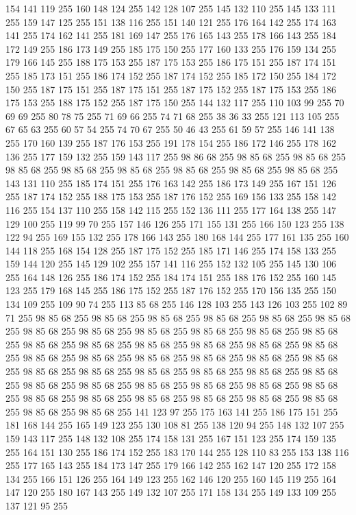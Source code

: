 154 141 119 255 160 148 124 255 142 128 107 255 145 132 110 255 145 133 111 255 159 147 125 255 151 138 116 255 151 140 121 255 176 164 142 255 174 163 141 255 174 162 141 255 181 169 147 255 176 165 143 255 178 166 143 255 184 172 149 255 186 173 149 255 185 175 150 255 177 160 133 255 176 159 134 255 179 166 145 255 188 175 153 255 187 175 153 255 186 175 151 255 187 174 151 255 185 173 151 255 186 174 152 255 187 174 152 255 185 172 150 255 184 172 150 255 187 175 151 255 187 175 151 255 187 175 152 255 187 175 153 255 186 175 153 255 188 175 152 255 187 175 150 255 144 132 117 255 110 103 99 255 70 69 69 255 80 78 75 255 71 69 66 255 74 71 68 255 38 36 33 255 121 113 105 255 67 65 63 255 60 57 54 255 74 70 67 255 50 46 43 255 61 59 57 255 146 141 138 255 170 160 139 255 187 176 153 255 191 178 154 255 186 172 146 255 178 162 136 255 177 159 132 255 159 143 117 255 98 86 68 255 98 85 68 255 98 85 68 255 98 85 68 255 98 85 68 255 98 85 68 255 98 85 68 255
98 85 68 255 98 85 68 255 143 131 110 255 185 174 151 255 176 163 142 255 186 173 149 255 167 151 126 255 187 174 152 255 188 175 153 255 187 176 152 255 169 156 133 255 158 142 116 255 154 137 110 255 158 142 115 255 152 136 111 255 177 164 138 255 147 129 100 255 119 99 70 255 157 146 126 255 171 155 131 255 166 150 123 255 138 122 94 255 169 155 132 255 178 166 143 255 180 168 144 255 177 161 135 255 160 144 118 255 168 154 128 255 187 175 152 255 185 171 146 255 174 158 133 255 159 144 120 255 145 129 102 255 157 141 116 255 152 132 105 255 145 130 106 255 164 148 126 255 186 174 152 255 184 174 151 255 188 176 152 255 160 145 123 255 179 168 145 255 186 175 152 255 187 176 152 255 170 156 135 255 150 134 109 255 109 90 74 255 113 85 68 255 146 128 103 255 143 126 103 255 102 89 71 255 98 85 68 255 98 85 68 255 98 85 68 255 98 85 68 255 98 85 68 255 98 85 68 255 98 85 68 255 98 85 68 255 98 85 68 255 98 85 68 255 98 85 68 255 98 85 68 255 98 85 68 255
98 85 68 255 98 85 68 255 98 85 68 255 98 85 68 255 98 85 68 255 98 85 68 255 98 85 68 255 98 85 68 255 98 85 68 255 98 85 68 255 98 85 68 255 98 85 68 255 98 85 68 255 98 85 68 255 98 85 68 255 98 85 68 255 98 85 68 255 98 85 68 255 98 85 68 255 98 85 68 255 98 85 68 255 98 85 68 255 98 85 68 255 98 85 68 255 98 85 68 255 98 85 68 255 98 85 68 255 98 85 68 255 98 85 68 255 98 85 68 255 98 85 68 255 141 123 97 255 175 163 141 255 186 175 151 255 181 168 144 255 165 149 123 255 130 108 81 255 138 120 94 255 148 132 107 255 159 143 117 255 148 132 108 255 174 158 131 255 167 151 123 255 174 159 135 255 164 151 130 255 186 174 152 255 183 170 144 255 128 110 83 255 153 138 116 255 177 165 143 255 184 173 147 255 179 166 142 255 162 147 120 255 172 158 134 255 166 151 126 255 164 149 123 255 162 146 120 255 160 145 119 255 164 147 120 255 180 167 143 255 149 132 107 255 171 158 134 255 149 133 109 255 137 121 95 255
